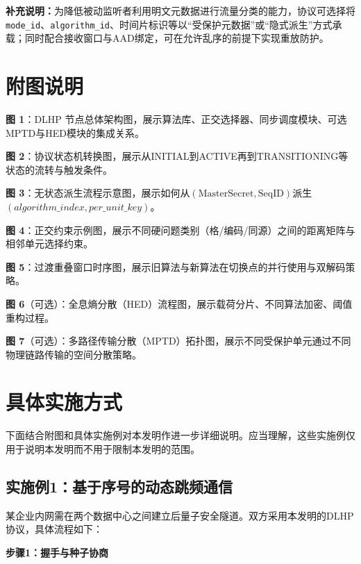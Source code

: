 \documentclass[12pt,a4paper]{article}
\begin{document}
\noindent\textbf{补充说明：}为降低被动监听者利用明文元数据进行流量分类的能力，协议可选择将\texttt{mode\_id}、\texttt{algorithm\_id}、时间片标识等以“受保护元数据”或“隐式派生”方式承载；同时配合接收窗口与AAD绑定，可在允许乱序的前提下实现重放防护。

\section{附图说明}

\textbf{图 1}：DLHP 节点总体架构图，展示算法库、正交选择器、同步调度模块、可选MPTD与HED模块的集成关系。

\textbf{图 2}：协议状态机转换图，展示从INITIAL到ACTIVE再到TRANSITIONING等状态的流转与触发条件。

\textbf{图 3}：无状态派生流程示意图，展示如何从$(\text{MasterSecret}, \text{SeqID})$派生$(algorithm\_index, per\_unit\_key)$。

\textbf{图 4}：正交约束示例图，展示不同硬问题类别（格/编码/同源）之间的距离矩阵与相邻单元选择约束。

\textbf{图 5}：过渡重叠窗口时序图，展示旧算法与新算法在切换点的并行使用与双解码策略。

\textbf{图 6}（可选）：全息熵分散（HED）流程图，展示载荷分片、不同算法加密、阈值重构过程。

\textbf{图 7}（可选）：多路径传输分散（MPTD）拓扑图，展示不同受保护单元通过不同物理链路传输的空间分散策略。

\section{具体实施方式}

下面结合附图和具体实施例对本发明作进一步详细说明。应当理解，这些实施例仅用于说明本发明而不用于限制本发明的范围。

\subsection{实施例1：基于序号的动态跳频通信}

某企业内网需在两个数据中心之间建立后量子安全隧道。双方采用本发明的DLHP协议，具体流程如下：

\textbf{步骤1：握手与种子协商}
\end{document}

